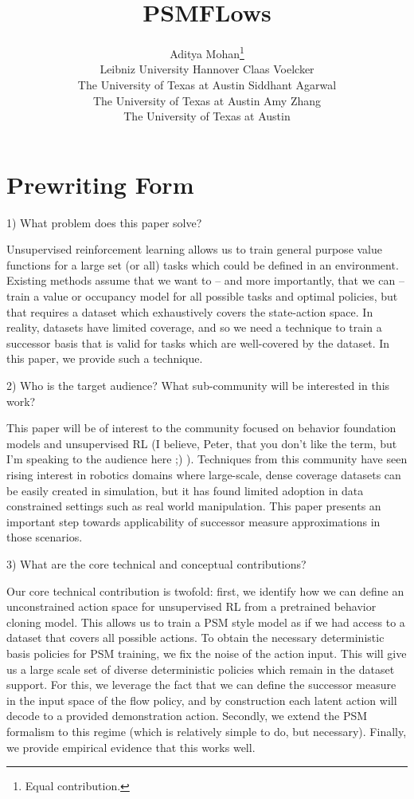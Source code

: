 \documentclass{article} %
\title{PSMFLows}
\author{%
Aditya Mohan\thanks{Equal contribution.} \\
Leibniz University Hannover
\And
Claas Voelcker\footnotemark[1] \\
The University of Texas at Austin
\And
Siddhant Agarwal \\
The University of Texas at Austin
\And
Amy Zhang \\
The University of Texas at Austin
}
\begin{document}
\maketitle

\section{Prewriting Form}

1) What problem does this paper solve?

Unsupervised reinforcement learning allows us to train general purpose value functions for a large set (or all) tasks which could be defined in an environment.
Existing methods assume that we want to -- and more importantly, that we can -- train a value or occupancy model for all possible tasks and optimal policies, but that requires a dataset which exhaustively covers the state-action space.
In reality, datasets have limited coverage, and so we need a technique to train a successor basis that is valid for tasks which are well-covered by the dataset.
In this paper, we provide such a technique.

2) Who is the target audience?  What sub-community will be interested in this work?

This paper will be of interest to the community focused on behavior foundation models and unsupervised RL (I believe, Peter, that you don't like the term, but I'm speaking to the audience here ;) ).
Techniques from this community have seen rising interest in robotics domains where large-scale, dense coverage datasets can be easily created in simulation, but it has found limited adoption in data constrained settings such as real world manipulation.
This paper presents an important step towards applicability of successor measure approximations in those scenarios.

3) What are the core technical and conceptual contributions?

Our core technical contribution is twofold: first, we identify how we can define an unconstrained action space for unsupervised RL from a pretrained behavior cloning model.
This allows us to train a PSM style model as if we had access to a dataset that covers all possible actions.
To obtain the necessary deterministic basis policies for PSM training, we fix the noise of the action input. This will give us a large scale set of diverse deterministic policies which remain in the dataset support.
For this, we leverage the fact that we can define the successor measure in the input space of the flow policy, and by construction each latent action will decode to a provided demonstration action.
Secondly, we extend the PSM formalism to this regime (which is relatively simple to do, but necessary).
Finally, we provide empirical evidence that this works well.
\end{document}
